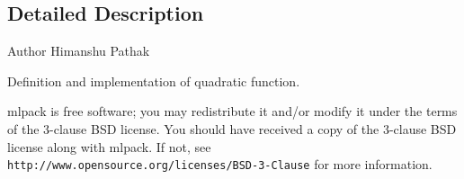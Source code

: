 \subsection{Detailed Description}
\begin{DoxyAuthor}{Author}
Himanshu Pathak
\end{DoxyAuthor}
Definition and implementation of quadratic function.

mlpack is free software; you may redistribute it and/or modify it under the terms of the 3-\/clause B\+SD license. You should have received a copy of the 3-\/clause B\+SD license along with mlpack. If not, see {\tt http\+://www.\+opensource.\+org/licenses/\+B\+S\+D-\/3-\/\+Clause} for more information. 